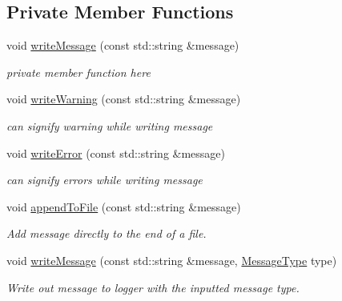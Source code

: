 \subsection*{Private Member Functions}
\begin{DoxyCompactItemize}
\item 
void \hyperlink{class_logger_ae3817d485c6cd1c0e7598f9ed04eee40}{write\+Message} (const std\+::string \&message)
\begin{DoxyCompactList}\small\item\em private member function here \end{DoxyCompactList}\item 
\hypertarget{class_logger_a7a3820c406816516897cbc20597baeef}{}void \hyperlink{class_logger_a7a3820c406816516897cbc20597baeef}{write\+Warning} (const std\+::string \&message)\label{class_logger_a7a3820c406816516897cbc20597baeef}

\begin{DoxyCompactList}\small\item\em can signify warning while writing message \end{DoxyCompactList}\item 
\hypertarget{class_logger_af05f58a38385716ce6f7931be159ee2e}{}void \hyperlink{class_logger_af05f58a38385716ce6f7931be159ee2e}{write\+Error} (const std\+::string \&message)\label{class_logger_af05f58a38385716ce6f7931be159ee2e}

\begin{DoxyCompactList}\small\item\em can signify errors while writing message \end{DoxyCompactList}\item 
\hypertarget{class_logger_a957909e27e8cc7c9a9ba783b1307d086}{}void \hyperlink{class_logger_a957909e27e8cc7c9a9ba783b1307d086}{append\+To\+File} (const std\+::string \&message)\label{class_logger_a957909e27e8cc7c9a9ba783b1307d086}

\begin{DoxyCompactList}\small\item\em Add message directly to the end of a file. \end{DoxyCompactList}\item 
\hypertarget{class_logger_a84b20f8727e1066a5742ec834b42ba41}{}void \hyperlink{class_logger_a84b20f8727e1066a5742ec834b42ba41}{write\+Message} (const std\+::string \&message, \hyperlink{class_logger_ad09ea848c6228767e3ad1085da600cd8}{Message\+Type} type)\label{class_logger_a84b20f8727e1066a5742ec834b42ba41}

\begin{DoxyCompactList}\small\item\em Write out message to logger with the inputted message type. \end{DoxyCompactList}\end{DoxyCompactItemize}

